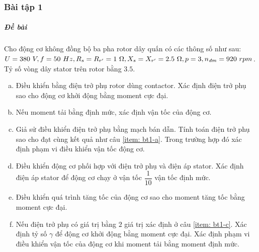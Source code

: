 \documentclass[12pt,a4paper]{article}
\begin{document}
\subsubsection{Bài tập 1}
\subparagraph{Đề bài} Cho động cơ không đồng bộ ba pha rotor dây quấn có các thông số như sau: $U = 380 \unit{V}, f = 50 \unit{Hz}, R_s = R_{r^ \prime}  = 1 \unit{\Omega}, X_s = X_{r^ \prime}  = 2.5 \unit{\Omega}, p = 3, \vitalic{n} = 920\unit{rpm}$. Tỷ số vòng dây stator trên rotor bằng $3.5$.
\begin{enumerate}[a.]
\item \label{item: bt1-a} Điều khiển bằng điện trở phụ rotor dùng contactor. Xác định điện trở phụ sao cho động cơ khởi động bằng moment cực đại.
\item Nếu moment tải bằng định mức, xác định vận tốc của động cơ.
\item \label{item: bt1-c} Giả sử điều khiển điện trở phụ bằng mạch bán dẫn. Tính toán điện trở phụ sao cho đạt cùng kết quả như câu \ref{item: bt1-a}. Trong trường hợp đó xác định phạm vi điều khiển vận tốc động cơ.
\item Điều khiển động cơ phối hợp với điện trở phụ và điện áp stator. Xác định điện áp stator để động cơ chạy ở vận tốc $ \dfrac{1}{10}$ vận tốc định mức.
\item Điều khiển quá trình tăng tốc của động cơ sao cho moment tăng tốc bằng moment cực đại.
\item Nếu điện trở phụ có giá trị bằng $2$ giá trị xác định ở câu \ref{item: bt1-c}. Xác định tỷ số $\gamma$ để động cơ khởi động bằng moment cực đại. Xác định phạm vi điều khiển vận tốc của động cơ khi moment tải bằng moment định mức.
\end{enumerate}
\end{document}
